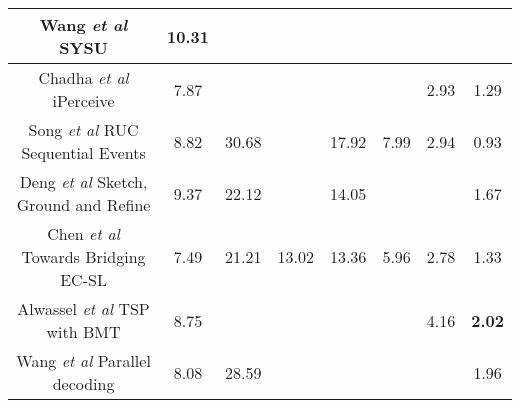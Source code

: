 \begin{table}[h]
\begin{tabular}{|c|cclllcc|}
		{Wang \textit{et al} \cite{wang2020densecaptioning} SYSU}                        & \multicolumn{1}{c|}{\textbf{10.31}}         & \multicolumn{1}{l|}{}               & \multicolumn{1}{l|}{}                & \multicolumn{1}{l|}{}                & \multicolumn{1}{l|}{}              & \multicolumn{1}{c|}{}              &                                    \\ \hline
		Chadha \textit{et al} \cite{chadha2020iperceive} iPerceive                 & \multicolumn{1}{c|}{7.87}          & \multicolumn{1}{l|}{}               & \multicolumn{1}{l|}{}                & \multicolumn{1}{l|}{}                & \multicolumn{1}{l|}{}              & \multicolumn{1}{c|}{2.93}          & 1.29                               \\ \hline
		Song \textit{et al} \cite{songruc} RUC Sequential Events                 & \multicolumn{1}{c|}{8.82}          & \multicolumn{1}{l|}{30.68}               & \multicolumn{1}{l|}{}                & \multicolumn{1}{l|}{17.92}                & \multicolumn{1}{l|}{7.99}              & \multicolumn{1}{c|}{2.94}          & 0.93                               \\ \hline
		Deng \textit{et al} \cite{deng2021sketch} Sketch, Ground and Refine   & \multicolumn{1}{c|}{9.37}          & \multicolumn{1}{c|}{22.12}          & \multicolumn{1}{l|}{}                & \multicolumn{1}{l|}{14.05}           & \multicolumn{1}{l|}{}              & \multicolumn{1}{c|}{}              & 1.67                               \\ \hline
		Chen \textit{et al} \cite{chen2021towards} Towards Bridging EC-SL      & \multicolumn{1}{c|}{7.49}          & \multicolumn{1}{c|}{21.21}          & \multicolumn{1}{l|}{13.02}           & \multicolumn{1}{l|}{13.36}           & \multicolumn{1}{l|}{5.96}          & \multicolumn{1}{c|}{2.78}          & 1.33                               \\ \hline
		{Alwassel \textit{et al} \cite{alwassel2021tsp} TSP with BMT}            & \multicolumn{1}{c|}{8.75}          & \multicolumn{1}{l|}{}               & \multicolumn{1}{l|}{}                & \multicolumn{1}{l|}{}                & \multicolumn{1}{l|}{}              & \multicolumn{1}{c|}{4.16}          & \textbf{2.02}                               \\ \hline
		Wang \textit{et al} \cite{wang2021endtoend} Parallel decoding           & \multicolumn{1}{c|}{8.08}          & \multicolumn{1}{c|}{28.59}          & \multicolumn{1}{l|}{}                & \multicolumn{1}{l|}{}                & \multicolumn{1}{l|}{}              & \multicolumn{1}{c|}{}              & 1.96                               \\ \hline

\end{tabular}
\end{table}

